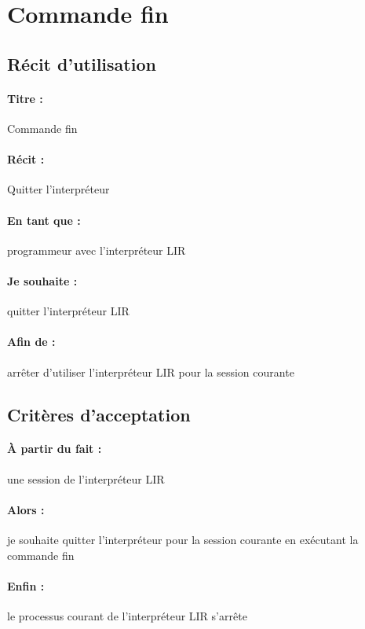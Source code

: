     \section{Commande fin}

    \subsection*{Récit d'utilisation}

    \paragraph{Titre : } Commande fin
    \paragraph{Récit : } Quitter l'interpréteur
    \paragraph{En tant que : } programmeur avec l'interpréteur LIR
    \paragraph{Je souhaite : } quitter l'interpréteur LIR
    \paragraph{Afin de : } arrêter d'utiliser l'interpréteur LIR pour la session courante

    \subsection*{Critères d'acceptation}

    \paragraph{À partir du fait : } une session de l'interpréteur LIR
    \paragraph{Alors : } je souhaite quitter l'interpréteur pour la session courante en exécutant la commande fin
    \paragraph{Enfin : } le processus courant de l'interpréteur LIR s'arrête